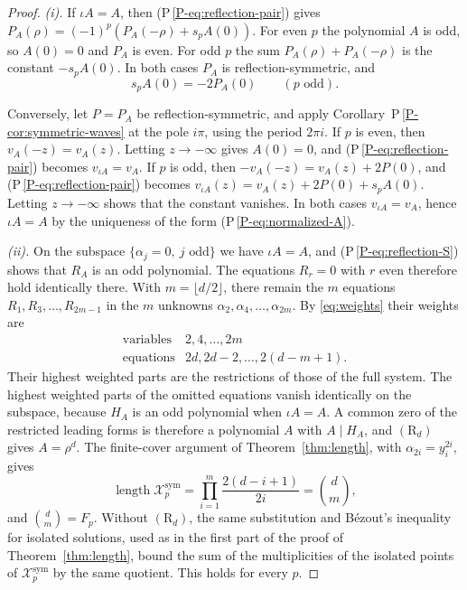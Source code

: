 \documentclass[11pt]{article}
\newcommand{\len}{\operatorname{length}}
\newcommand{\Xp}{\mathcal X_p}
\numberwithin{equation}{section}
\begin{document}
\begin{proof}
\emph{(i).} If \(\iota A=A\), then (P\,\ref{P-eq:reflection-pair}) gives
\(P_A(\rho)=(-1)^p(P_A(-\rho)+s_pA(0))\). For even \(p\) the
polynomial \(A\) is odd, so \(A(0)=0\) and \(P_A\) is even. For odd
\(p\) the sum \(P_A(\rho)+P_A(-\rho)\) is the constant \(-s_pA(0)\).
In both cases \(P_A\) is reflection-symmetric, and
\begin{equation}\label{eq:symmetric-endpoint}
 s_pA(0)=-2P_A(0)\qquad(p\text{ odd}).
\end{equation}

Conversely, let \(P=P_A\) be reflection-symmetric, and apply
Corollary~P\,\ref{P-cor:symmetric-waves} at the pole \(i\pi\), using the
period \(2\pi i\). If \(p\) is even, then \(v_A(-z)=v_A(z)\). Letting
\(z\to-\infty\) gives \(A(0)=0\), and (P\,\ref{P-eq:reflection-pair})
becomes \(v_{\iota A}=v_A\). If \(p\) is odd, then
\(-v_A(-z)=v_A(z)+2P(0)\), and (P\,\ref{P-eq:reflection-pair}) becomes
\(v_{\iota A}(z)=v_A(z)+2P(0)+s_pA(0)\). Letting \(z\to-\infty\) shows
that the constant vanishes. In both cases \(v_{\iota A}=v_A\), hence
\(\iota A=A\) by the uniqueness of the form (P\,\ref{P-eq:normalized-A}).

\emph{(ii).} On the subspace \(\{\alpha_j=0,\ j\text{ odd}\}\) we have
\(\iota A=A\), and (P\,\ref{P-eq:reflection-S}) shows that \(R_A\) is an odd
polynomial. The equations \(R_r=0\) with \(r\) even therefore hold
identically there. With \(m=\lfloor d/2\rfloor\), there remain the
\(m\) equations \(R_1,R_3,\ldots,R_{2m-1}\) in the \(m\) unknowns
\(\alpha_2,\alpha_4,\ldots,\alpha_{2m}\). By \eqref{eq:weights} their
weights are
\[
 \begin{array}{c|c}
 \text{variables}&2,4,\ldots,2m\\
 \text{equations}&2d,2d-2,\ldots,2(d-m+1).
 \end{array}
\]
Their highest weighted parts are the restrictions of those of the full
system. The highest weighted parts of the omitted equations vanish
identically on the subspace, because \(H_A\) is an odd polynomial when
\(\iota A=A\). A common zero of the restricted leading
forms is therefore a polynomial \(A\) with \(A\mid H_A\), and
\((\mathrm R_d)\) gives \(A=\rho^d\). The finite-cover argument of
Theorem~\ref{thm:length}, with \(\alpha_{2i}=y_i^{2i}\), gives
\[
 \len\Xp^{\mathrm{sym}}
 =\prod_{i=1}^{m}\frac{2(d-i+1)}{2i}=\binom dm ,
\]
and \(\binom dm=F_p\). Without \((\mathrm R_d)\), the same substitution
and B\'ezout's inequality for isolated solutions, used as in the first
part of the proof of Theorem~\ref{thm:length}, bound the sum of the
multiplicities of the isolated points of \(\Xp^{\mathrm{sym}}\) by the
same quotient. This holds for every \(p\).


\end{proof}
\end{document}
